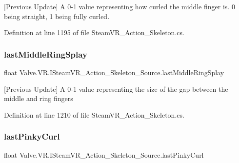 \mbox{[}Previous Update\mbox{]} A 0-\/1 value representing how curled the middle finger is. 0 being straight, 1 being fully curled. 



Definition at line 1195 of file Steam\+V\+R\+\_\+\+Action\+\_\+\+Skeleton.\+cs.

\mbox{\label{interface_valve_1_1_v_r_1_1_i_steam_v_r___action___skeleton___source_a62a9fe5c572c15f96407207ab8e9860c}} 
\subsubsection{\texorpdfstring{lastMiddleRingSplay}{lastMiddleRingSplay}}
{\footnotesize\ttfamily float Valve.\+V\+R.\+I\+Steam\+V\+R\+\_\+\+Action\+\_\+\+Skeleton\+\_\+\+Source.\+last\+Middle\+Ring\+Splay\hspace{0.3cm}{\ttfamily [get]}}



\mbox{[}Previous Update\mbox{]} A 0-\/1 value representing the size of the gap between the middle and ring fingers 



Definition at line 1210 of file Steam\+V\+R\+\_\+\+Action\+\_\+\+Skeleton.\+cs.

\mbox{\label{interface_valve_1_1_v_r_1_1_i_steam_v_r___action___skeleton___source_a7e67ea0a668307684b891c6cdfbc23d6}} 
\subsubsection{\texorpdfstring{lastPinkyCurl}{lastPinkyCurl}}
{\footnotesize\ttfamily float Valve.\+V\+R.\+I\+Steam\+V\+R\+\_\+\+Action\+\_\+\+Skeleton\+\_\+\+Source.\+last\+Pinky\+Curl\hspace{0.3cm}{\ttfamily [get]}}



